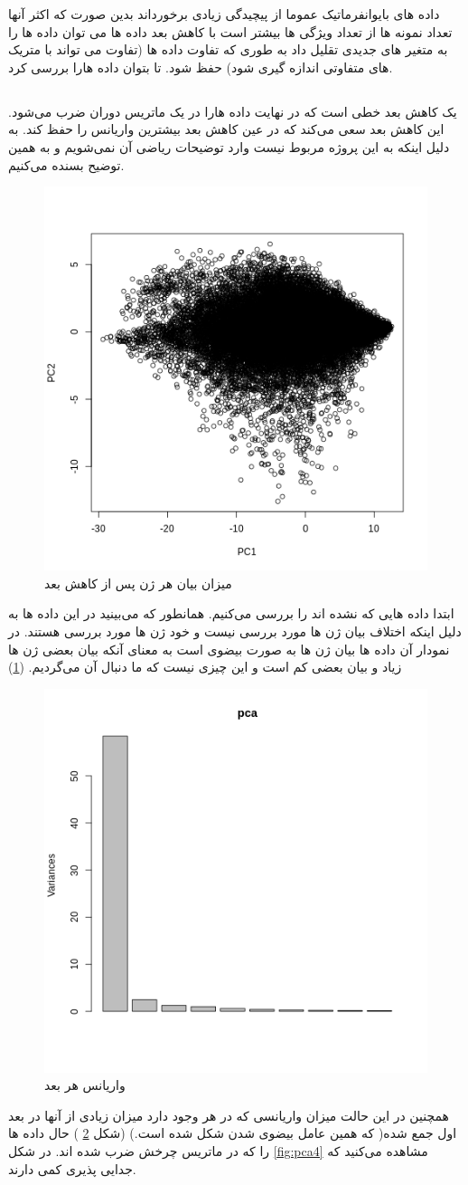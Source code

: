 \documentclass{article}
\begin{document}
داده های بایوانفرماتیک عموما از پیچیدگی زیادی برخورداند بدین صورت که اکثر آنها تعداد نمونه ها از تعداد ویژگی ها بیشتر است  با کاهش بعد داده ها می توان داده ها را به متغیر های جدیدی تقلیل داد به طوری که تفاوت داده ها (تفاوت می تواند با متریک های متفاوتی اندازه گیری شود) حفظ شود.
تا بتوان داده هارا بررسی کرد.
\subsection{}
یک کاهش بعد خطی است که در نهایت داده هارا در یک ماتریس دوران ضرب می‌شود.
این کاهش بعد سعی می‌کند که در عین کاهش بعد بیشترین واریانس را حفظ کند. به دلیل اینکه به این پروژه مربوط نیست وارد توضیحات ریاضی آن نمی‌شویم و به همین توضیح بسنده می‌کنیم. 


\begin{figure}[!h]
	\centering
	\includegraphics[width=0.5\columnwidth]{figs/pca2.png}
	\caption{میزان بیان هر ژن پس از کاهش بعد}
	\label{fig:pca2}
\end{figure}
ابتدا داده هایی که  نشده اند را بررسی می‌کنیم.
همانطور که می‌بینید در این داده ها به دلیل اینکه اختلاف بیان ژن ها مورد بررسی نیست و خود ژن ها مورد بررسی هستند. در نمودار آن داده ها بیان ژن ها به صورت بیضوی است به معنای آنکه بیان بعضی ژن ها زیاد و بیان بعضی کم است و این چیزی نیست که ما دنبال آن می‌گردیم.
(\ref{fig:pca2})

\begin{figure}[h!]
	\centering
	\includegraphics[width=0.5\columnwidth]{figs/pca3.png}
	\caption{واریانس هر بعد}
	\label{fig:pca3}
\end{figure}
همچنین در این حالت میزان واریانسی که در هر 
وجود دارد میزان زیادی از آنها در بعد اول جمع شده( که همین عامل بیضوی شدن شکل شده است.) (شکل \ref{fig:pca3}
)
حال داده ها را که در ماتریس چرخش ضرب شده اند. در شکل \ref{fig:pca4} مشاهده می‌کنید که جدایی پذیری کمی دارند.
\end{document}
